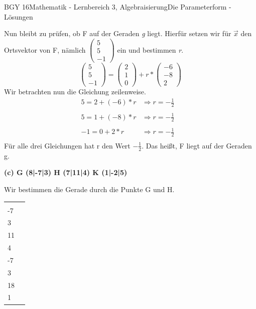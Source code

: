 \documentclass[oneside,openany,headings=optiontotoc,11pt,numbers=noenddot]{scrreprt}
\begin{document}
\begin{worksheet}{BGY 16}{Mathematik - Lernbereich 3, Algebraisierung}{Die Parameterform - Lösungen}
\begin{framed}
			\par\noindent
			Nun bleibt zu prüfen, ob F auf der Geraden \textit{g} liegt. Hierfür setzen wir für \(\vec{x}\)	den Ortsvektor von F, nämlich \(\left(\begin{array}{c}5\\5\\-1\end{array}\right)\) ein und bestimmen \textit{r}.\\
			\[\left(\begin{array}{c}5\\5\\-1\end{array}\right) = \left(\begin{array}{c}2\\1\\0\end{array}\right) + r*\left(\begin{array}{c}-6\\-8\\2\end{array}\right)\]
			Wir betrachten nun die Gleichung zeilenweise.
			\[\begin{array}{llc}
			5 = 2 + (-6)*r& \Rightarrow r = -\frac{1}{2}&\\
			&&\\
			5 = 1 + (-8)*r & \Rightarrow r = -\frac{1}{2}&\\
			&&\\
			-1 = 0 + 2*r & \Rightarrow r = -\frac{1}{2} &\\
			\end{array}\]
			Für alle drei Gleichungen hat r den Wert \(-\frac{1}{2}\). Das heißt, F liegt auf der Geraden g.\\
			\par
			\textbf{(c) G (8|-7|3) H (7|11|4) K (1|-2|5)}\\
			\par\noindent
			Wir bestimmen die Gerade durch die Punkte G und H.\\
			\par\noindent
			\begin{tabularx}{\textwidth}{XX}
				\(\overrightarrow{OG} = \vec{G} -\vec{O} = \left(\begin{array}{c}8\\-7\\3\end{array}\right)\) & \(\overrightarrow{GH} = \vec{H} -\vec{G} = \left(\begin{array}{c}7\\11\\4\end{array}\right) - \left(\begin{array}{c}8\\-7\\3\end{array}\right) = \left(\begin{array}{c}-1\\18\\1\end{array}\right)\)

\end{tabularx}
\end{framed}
\end{worksheet}
\end{document}
